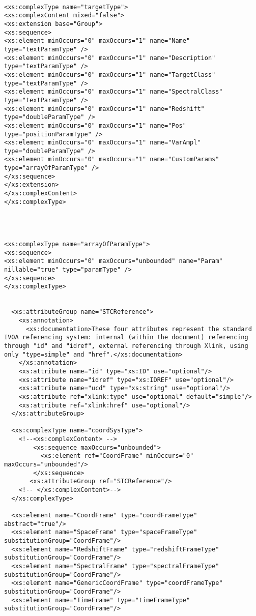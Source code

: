 {\begin{flushleft}
\begin{fmppage}
\begin{verbatim}
\end{verbatim}
\end{fmppage}

\begin{fmppage}
\begin{verbatim}

<xs:complexType name="targetType">
<xs:complexContent mixed="false">
<xs:extension base="Group">
<xs:sequence>
<xs:element minOccurs="0" maxOccurs="1" name="Name" type="textParamType" />
<xs:element minOccurs="0" maxOccurs="1" name="Description" type="textParamType" />
<xs:element minOccurs="0" maxOccurs="1" name="TargetClass" type="textParamType" />
<xs:element minOccurs="0" maxOccurs="1" name="SpectralClass" type="textParamType" />
<xs:element minOccurs="0" maxOccurs="1" name="Redshift" type="doubleParamType" />
<xs:element minOccurs="0" maxOccurs="1" name="Pos" type="positionParamType" />
<xs:element minOccurs="0" maxOccurs="1" name="VarAmpl" type="doubleParamType" />
<xs:element minOccurs="0" maxOccurs="1" name="CustomParams" type="arrayOfParamType" />
</xs:sequence>
</xs:extension>
</xs:complexContent>
</xs:complexType>




<xs:complexType name="arrayOfParamType">
<xs:sequence>
<xs:element minOccurs="0" maxOccurs="unbounded" name="Param" nillable="true" type="paramType" />
</xs:sequence>
</xs:complexType>


  <xs:attributeGroup name="STCReference">
    <xs:annotation>
      <xs:documentation>These four attributes represent the standard IVOA referencing system: internal (within the document) referencing through "id" and "idref", external referencing through Xlink, using only "type=simple" and "href".</xs:documentation>
    </xs:annotation>
    <xs:attribute name="id" type="xs:ID" use="optional"/>
    <xs:attribute name="idref" type="xs:IDREF" use="optional"/>
    <xs:attribute name="ucd" type="xs:string" use="optional"/>
    <xs:attribute ref="xlink:type" use="optional" default="simple"/>
    <xs:attribute ref="xlink:href" use="optional"/>
  </xs:attributeGroup>

  <xs:complexType name="coordSysType">
    <!--<xs:complexContent> -->
        <xs:sequence maxOccurs="unbounded">
          <xs:element ref="CoordFrame" minOccurs="0" maxOccurs="unbounded"/>
        </xs:sequence>
       <xs:attributeGroup ref="STCReference"/>
    <!-- </xs:complexContent>-->
  </xs:complexType>

  <xs:element name="CoordFrame" type="coordFrameType" abstract="true"/>
  <xs:element name="SpaceFrame" type="spaceFrameType" substitutionGroup="CoordFrame"/>
  <xs:element name="RedshiftFrame" type="redshiftFrameType" substitutionGroup="CoordFrame"/>
  <xs:element name="SpectralFrame" type="spectralFrameType" substitutionGroup="CoordFrame"/> 
  <xs:element name="GenericCoordFrame" type="coordFrameType" substitutionGroup="CoordFrame"/>
  <xs:element name="TimeFrame" type="timeFrameType" substitutionGroup="CoordFrame"/>


\end{verbatim}
\end{fmppage}
\end{flushleft}}
